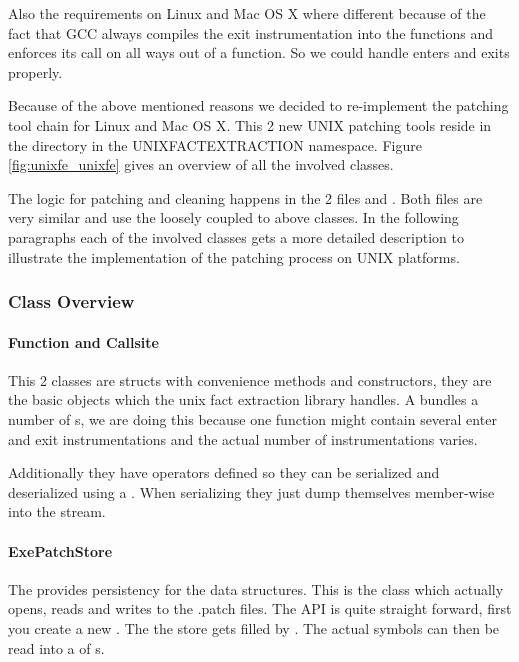Also the requirements on Linux and Mac OS X where different because of the fact that GCC always compiles the exit instrumentation into the functions and enforces its call on all ways out of a function.  So we could handle enters and exits properly.

Because of the above mentioned reasons we decided to re-implement the patching tool chain for Linux and Mac OS X.  This 2 new UNIX patching tools reside in the  directory in the UNIXFACTEXTRACTION namespace.  Figure \ref{fig:unixfe_unixfe} gives an overview of all the involved classes.

The logic for patching and cleaning happens in the 2 files  and .  Both files are very similar and use the loosely coupled to above classes.  In the following paragraphs each of the involved classes gets a more detailed description to illustrate the implementation of the patching process on UNIX platforms.

\subsubsection{Class Overview}

\paragraph{Function and Callsite}

This 2 classes are structs with convenience methods and constructors, they are the basic objects which the unix fact extraction library handles.  A  bundles a number of s, we are doing this because one function might contain several enter and exit instrumentations and the actual number of instrumentations varies.

Additionally they have operators defined so they can be serialized and deserialized using a .  When serializing they just dump themselves member-wise into the stream.

\paragraph{ExePatchStore}

The  provides persistency for the data structures.  This is the class which actually opens, reads and writes to the .patch files.  The API is quite straight forward, first you create a new .  The the store gets filled by .  The actual symbols can then be read into a  of s.

